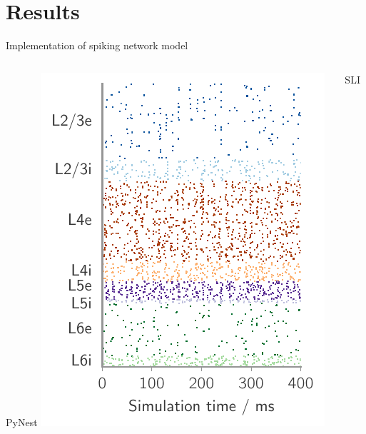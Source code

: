 \documentclass[xcolor=x11names,compress]{beamer}
\renewcommand{\(}{\begin{columns}}
\renewcommand{\)}{\end{columns}}
\newcommand{\<}[1]{\begin{column}{#1}}
\renewcommand{\>}{\end{column}}
\begin{document}
\section{Results}
\label{sec:results}

\begin{frame}[t]{Implementation of spiking network model}
    \begin{columns}[T] %
    \begin{column}[T]{5cm} %
            PyNest
            \includegraphics[width=1.0\linewidth]{../figures/raster_plot}
    \end{column}
    \begin{column}[T]{5cm} %
            SLI

\end{column}
\end{columns}
\end{frame}
\end{document}
